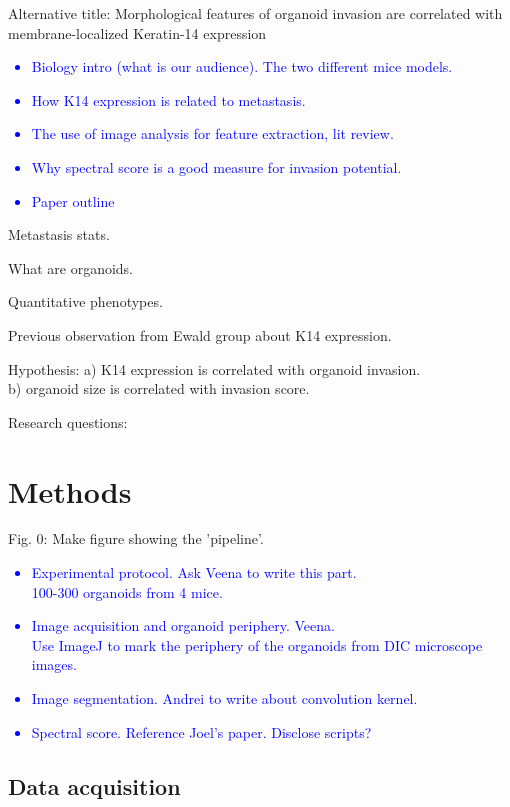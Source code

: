 \documentclass[runningheads]{llncs}
\begin{document}
Alternative title: Morphological features of organoid invasion are correlated with membrane-localized Keratin-14 expression

\textcolor{blue}{
\begin{itemize}
    \item Biology intro (what is our audience). The two different mice models.
    \item How K14 expression is related to metastasis.
    \item The use of image analysis for feature extraction, lit review.
    \item Why spectral score is a good measure for invasion potential.
    \item Paper outline
\end{itemize}
}

Metastasis stats.

What are organoids.

Quantitative phenotypes.

Previous observation from Ewald group about K14 expression.

Hypothesis: a) K14 expression is correlated with organoid invasion.\\
b) organoid size is correlated with invasion score.

Research questions:


\section {Methods}

Fig. 0: Make figure showing the 'pipeline'.

\textcolor{blue}{
\begin{itemize}
    \item Experimental protocol. Ask Veena to write this part.\\ 
        100-300 organoids from 4 mice.
    \item Image acquisition and organoid periphery. Veena.\\
        Use ImageJ to mark the periphery of the organoids from DIC microscope images.
    \item Image segmentation. Andrei to write about convolution kernel.
    \item Spectral score. Reference Joel's paper. Disclose scripts?
\end{itemize}
}

\subsection{Data acquisition}
\end{document}
